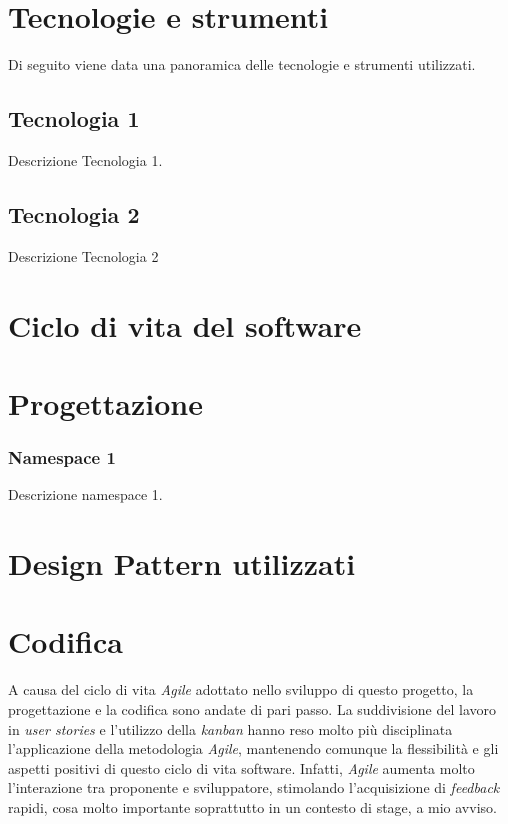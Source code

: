 
\section{Tecnologie e strumenti}
\label{sec:tecnologie-strumenti}

Di seguito viene data una panoramica delle tecnologie e strumenti utilizzati.

\subsection*{Tecnologia 1}
Descrizione Tecnologia 1.

\subsection*{Tecnologia 2}
Descrizione Tecnologia 2

\section{Ciclo di vita del software}
\label{sec:ciclo-vita-software}

\section{Progettazione}
\label{sec:progettazione}

\subsubsection{Namespace 1} %
Descrizione namespace 1.

\begin{namespacedesc}
\end{namespacedesc}


\section{Design Pattern utilizzati}

\section{Codifica}
A causa del ciclo di vita \emph{Agile} adottato nello sviluppo di questo progetto, la progettazione e la codifica sono andate di pari passo. La suddivisione del lavoro in \emph{user stories} e l'utilizzo della \emph{kanban} hanno reso molto più disciplinata l'applicazione della metodologia \emph{Agile}, mantenendo comunque la flessibilità e gli aspetti positivi di questo ciclo di vita software. Infatti, \emph{Agile} aumenta molto l'interazione tra proponente e sviluppatore, stimolando l'acquisizione di \emph{feedback} rapidi, cosa molto importante soprattutto in un contesto di stage, a mio avviso.

